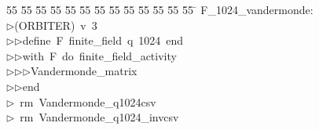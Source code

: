 %
%
\begin{tabbing}
55 \= 55 \= 55 \= 55 \= 55 \= 55 \= 55 \= 55 \= 55 \= 55 \= 55 \= 55 \= 55 \= \kill
F\_1024\_vandermonde:\\[0pt]
$\triangleright$\>(ORBITER)\ v\ 3\ \\[0pt]
$\triangleright$\>$\triangleright$\>define\ F\ finite\_field\ q\ 1024\ end\ \\[0pt]
$\triangleright$\>$\triangleright$\>with\ F\ do\ finite\_field\_activity\ \\[0pt]
$\triangleright$\>$\triangleright$\>$\triangleright$\>Vandermonde\_matrix\ \\[0pt]
$\triangleright$\>$\triangleright$\>end\\[0pt]
$\triangleright$\>\ rm\ Vandermonde\_q1024csv\\[0pt]
$\triangleright$\>\ rm\ Vandermonde\_q1024\_invcsv\\[0pt]
\end{tabbing}
